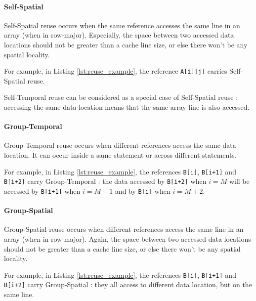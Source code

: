 \documentclass[paper=a4, fontsize=11.5pt]{scrartcl}
\numberwithin{equation}{section}        %
\numberwithin{figure}{section}          %
\numberwithin{table}{section}               %
\begin{document}
            \paragraph{Self-Spatial}
                Self-Spatial reuse occurs when the same reference accesses the same
                line in an array (when in row-major). Especially, the space between
                two accessed data locations should not be greater than a cache line size,
                or else there won't be any spatial locality.

                For example, in Listing \ref{lst:reuse_example}, the reference \verb'A[i][j]' carries
                Self-Spatial reuse.

                Self-Temporal reuse can be considered as a special case of
                Self-Spatial reuse : accessing the same data location means that
                the same array line is also accessed.
            \paragraph{Group-Temporal}
                Group-Temporal reuse occurs when different references access the same
                data location. It can occur inside a same statement or across different
                statements.

                For example, in Listing \ref{lst:reuse_example}, the references
                \verb'B[i]', \verb'B[i+1]' and \verb'B[i+2]' carry Group-Temporal :
                the data accessed by \verb'B[i+2]' when $i=M$ will be accessed by
                \verb'B[i+1]' when $i=M+1$ and by \verb'B[i]' when $i=M+2$.

            \paragraph{Group-Spatial}
                Group-Spatial reuse occurs when different references access the same
                line in an array (when in row-major). Again, the space between
                two accessed data locations should not be greater than a cache line size,
                or else there won't be any spatial locality.
                
                For example, in Listing \ref{lst:reuse_example}, the references
                \verb'B[i]', \verb'B[i+1]' and \verb'B[i+2]' carry Group-Spatial :
                they all access to different data location, but on the same line.\\
                \\
\end{document}
